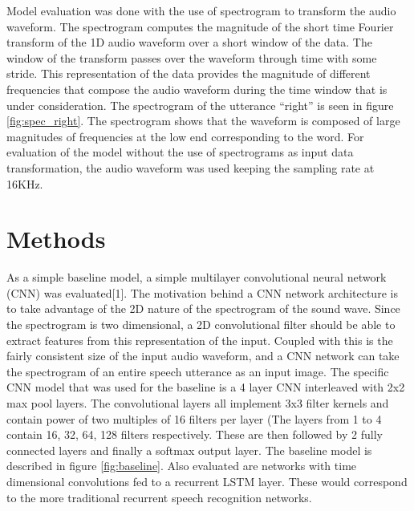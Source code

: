 \documentclass{article}
\begin{document}
Model evaluation was done with the use of spectrogram to
transform the audio waveform. The spectrogram computes the magnitude
of the short time Fourier transform of the 1D audio waveform over a
short window of the data. The window of the transform passes over the
waveform through time with some stride. This representation of the
data provides the magnitude of different frequencies that compose the
audio waveform during the time window that is under consideration. The
spectrogram of the utterance ``right'' is seen in figure
\ref{fig:spec_right}. The spectrogram shows that the waveform is
composed of large magnitudes of frequencies at the low end
corresponding to the word. For evaluation of the model without the use
of spectrograms as input data transformation, the audio waveform was
used keeping the sampling rate at 16KHz.

\section{ Methods }
As a simple baseline model, a simple multilayer convolutional neural
network (CNN) was evaluated[1]. The motivation behind a CNN network
architecture is to take advantage of the 2D nature of the spectrogram
of the sound wave. Since the spectrogram is two dimensional, a 2D
convolutional filter should be able to extract features from this
representation of the input. Coupled with this is the fairly
consistent size of the input audio waveform, and a CNN network can
take the spectrogram of an entire speech utterance as an input
image. The specific CNN model that was used for the baseline is a 4
layer CNN interleaved with 2x2 max pool layers\cite{oxerin-baseline}. The convolutional
layers all implement 3x3 filter kernels and contain power of two
multiples of 16 filters per layer (The layers from 1 to 4 contain
16, 32, 64, 128 filters respectively. These are then followed by 2
fully connected layers and finally a softmax output layer. The
baseline model is described in figure \ref{fig:baseline}. Also
evaluated are networks with time dimensional convolutions fed to a
recurrent LSTM layer. These would correspond to the more traditional
recurrent speech recognition networks.
\end{document}
